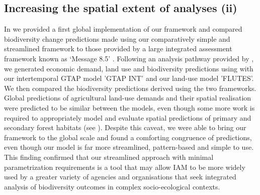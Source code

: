 \documentclass[titlesmallcaps,copyrightpage]{uomthesis}\usepackage[]{graphicx}\usepackage[]{color}
\begin{document}
\subsection{Increasing the spatial extent of analyses (ii)}
In  we provided a first global implementation of our framework and compared biodiversity change predictions made using our comparatively simple and streamlined framework to those provided by a large integrated assessment framework known as ‘Message 8.5’ \citep{riahi_rcp_2011}. Following an analysis pathway provided by \citet{newbold_global_2015}, we generated economic demand, land use and biodiversity predictions using with our intertemporal GTAP model ’GTAP INT’ and our land-use model ’FLUTES’. We then compared the biodiversity predictions derived using the two frameworks. Global predictions of agricultural land-use demands and their spatial realisation were predicted to be similar between the models, even though some more work is required to appropriately model and evaluate spatial predictions of primary and secondary forest habitats (see ). Despite  this caveat, we were able to bring our framework to the global scale and found a comforting congruence of predictions, even though our model is far more streamlined, pattern-based and simple to use. This finding confirmed that our streamlined approach with minimal parametrization requirements is a tool that may allow IAM to be more widely used by a greater variety of agencies and organisations that seek integrated analysis of biodiversity outcomes in complex socio-ecological contexts.
\end{document}
